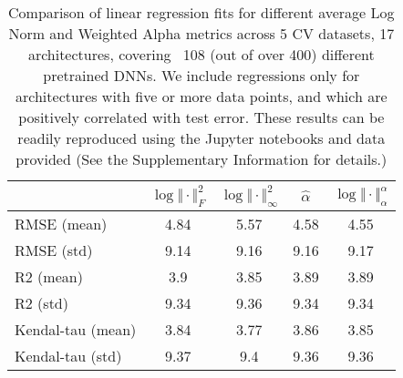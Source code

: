 
\begin{table}[t]
\small
\begin{center}
\begin{tabular}{|p{1.25in}|c|c|c|c|}
\hline
  & $\log\Vert\cdot\Vert^{2}_{F}$ & $\log\Vert\cdot\Vert^{2}_{\infty}$ & $\hat{\alpha}$ & $\log\Vert\cdot\Vert^{\alpha}_{\alpha}$ \\
\hline

RMSE (mean) & 4.84 & 5.57 & 4.58& 4.55 \\
RMSE (std) & 9.14 & 9.16 & 9.16& 9.17 \\
\hline
R2 (mean) & 3.9 & 3.85 & 3.89& 3.89 \\
R2 (std) & 9.34 & 9.36 & 9.34& 9.34 \\
\hline
Kendal-tau (mean) & 3.84 & 3.77 & 3.86& 3.85 \\
Kendal-tau (std) & 9.37 & 9.4 & 9.36& 9.36 \\
\hline

\hline
\end{tabular}
\end{center}
\caption{Comparison of linear regression fits for different average Log Norm and Weighted Alpha metrics across 5 CV datasets, 17 architectures, covering \
108 (out of over 400) different pretrained DNNs.
         We include regressions only for architectures with five or more data points, and which are positively correlated with test error.
         These results can be readily reproduced using the Jupyter notebooks and data provided 
         (See the Supplementary Information
         for details.)}
\label{table:results}
\end{table}


